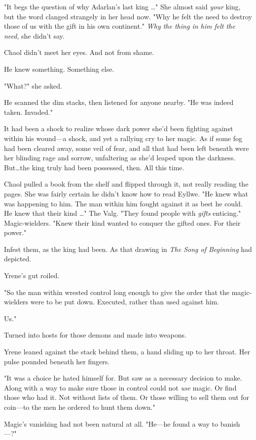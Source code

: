 "It begs the question of why Adarlan's last king \ldots" She almost said \emph{your} king, but the word clanged strangely in her head now.
"Why he felt the need to destroy those of us with the gift in his own continent."
\emph{Why the thing in him felt the need}, she didn't say.

Chaol didn't meet her eyes.
And not from shame.

He knew something.
Something else.

"What?"
she asked.

He scanned the dim stacks, then listened for anyone nearby.
"He was indeed  taken.
Invaded."

It had been a shock to realize whose dark power she'd been fighting against within his wound---a shock, and yet a rallying cry to her magic.
As if some fog had been cleared away, some veil of fear, and all that had been left beneath were her blinding rage and sorrow, unfaltering as she'd leaped upon the darkness.
But\ldots the king truly had been possessed, then.
All this time.

Chaol pulled a book from the shelf and flipped through it, not really reading the pages.
She was fairly certain he didn't know how to read Eyllwe.
"He knew what was happening to him.
The man within him fought against it as best he could.
He knew that their kind \ldots" The Valg.
"They found people with \emph{gifts}  enticing."
Magic-wielders.
"Knew their kind wanted to conquer the gifted ones.
For their power."

Infest them, as the king had been.
As that drawing in \emph{The Song of Beginning} had depicted.

Yrene's gut roiled.

"So the man within wrested control long enough to give the order that the magic-wielders were to be put down.
Executed, rather than used against him.

Us."

Turned into hosts for those demons and made into weapons.

Yrene leaned against the stack behind them, a hand sliding up to her throat.
Her pulse pounded beneath her fingers.

"It was a choice he hated himself for.
But saw as a necessary decision to make.
Along with a way to make sure those in control could not \emph{use} magic.
Or find those who had it.
Not without lists of them.
Or those willing to sell them out for coin---to the men he ordered to hunt them down."

Magic's vanishing had not been natural at all.
"He---he found a way to banish ---?"

